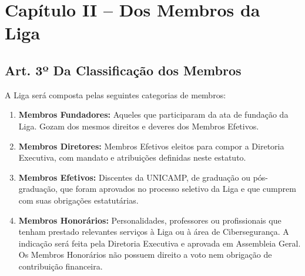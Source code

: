 \documentclass[12pt, a4paper]{article}
\begin{document}
\section{Capítulo II – Dos Membros da Liga}


\subsection{Art. 3º Da Classificação dos Membros}
A Liga será composta pelas seguintes categorias de membros:
\begin{enumerate}[label=\alph*)]
    \item \textbf{Membros Fundadores:} Aqueles que participaram da ata de fundação da Liga. Gozam dos mesmos direitos e deveres dos Membros Efetivos.
    \item \textbf{Membros Diretores:} Membros Efetivos eleitos para compor a Diretoria Executiva, com mandato e atribuições definidas neste estatuto.
    \item \textbf{Membros Efetivos:} Discentes da UNICAMP, de graduação ou pós-graduação, que foram aprovados no processo seletivo da Liga e que cumprem com suas obrigações estatutárias.
    \item \textbf{Membros Honorários:} Personalidades, professores ou profissionais que tenham prestado relevantes serviços à Liga ou à área de Cibersegurança. A indicação será feita pela Diretoria Executiva e aprovada em Assembleia Geral. Os Membros Honorários não possuem direito a voto nem obrigação de contribuição financeira.
\end{enumerate}
\end{document}
